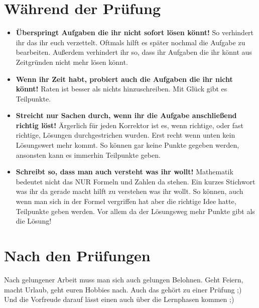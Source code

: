 	\section{Während der Prüfung}
		\begin{itemize}
		  \item \textbf{Überspringt Aufgaben die ihr nicht sofort lösen könnt!} So
		  verhindert ihr das ihr euch verzettelt. Oftmals hilft es später nochmal die
		  Aufgabe zu bearbeiten. Außerdem verhindert ihr so, dass ihr Aufgaben die ihr
		  könnt aus Zeitgründen nicht mehr lösen könnt.
		  \item \textbf{Wenn ihr Zeit habt, probiert auch die Aufgaben die ihr nicht
		  könnt!} Raten ist besser als nichts hinzuschreiben. Mit Glück gibt es
		  Teilpunkte.
		  \item \textbf{Streicht nur Sachen durch, wenn ihr die Aufgabe anschließend
		  richtig löst!} Ärgerlich für jeden Korrektor ist es, wenn richtige, oder
		  fast richtige, Lösungen durchgestrichen wurden. Erst recht wenn unten kein
		  Lösungswert mehr kommt. So können gar keine Punkte gegeben werden, ansonsten
		  kann es immerhin Teilpunkte geben.
		  \item \textbf{Schreibt so, dass man auch versteht was ihr wollt!} Mathematik
		  bedeutet nicht das NUR Formeln und Zahlen da stehen. Ein kurzes Stichwort
		  was ihr da gerade macht hilft zu verstehen was ihr wollt. So können, auch
		  wenn man sich in der Formel vergriffen hat aber die richtige Idee hatte,
		  Teilpunkte geben werden. Vor allem da der Lösungsweg mehr Punkte gibt als
		  die Lösung!
		\end{itemize}
		
	\section{Nach den Prüfungen}
		Nach gelungener Arbeit muss man sich auch gelungen Belohnen. Geht Feiern,
		macht Urlaub, geht euren Hobbies nach. Auch das gehört zu einer Prüfung ;) Und
		die Vorfreude darauf lässt einen auch über die Lernphasen kommen ;)
